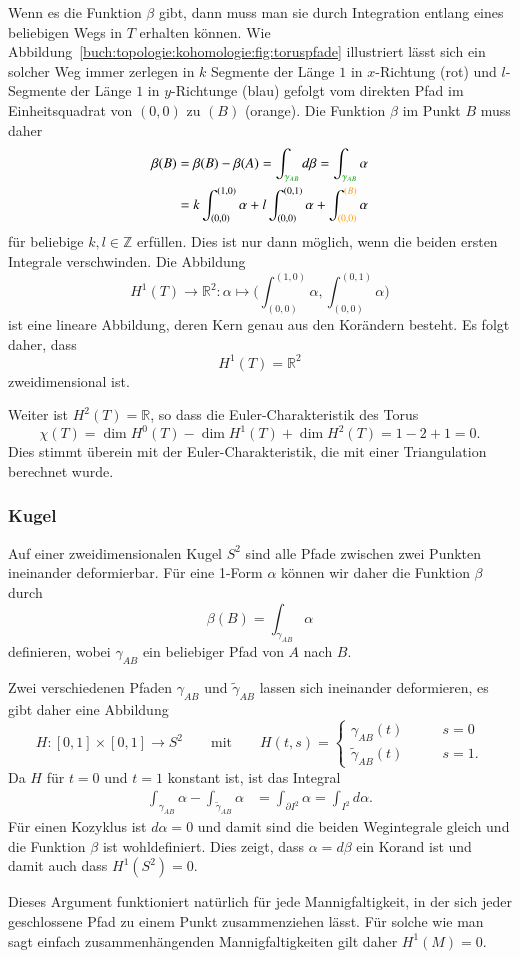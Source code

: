 Wenn es die Funktion $\beta$ gibt, dann muss man sie durch Integration
entlang eines beliebigen Wegs in $T$ erhalten können.
Wie Abbildung~\ref{buch:topologie:kohomologie:fig:toruspfade}
illustriert lässt sich ein solcher Weg immer zerlegen in 
$k$ Segmente der Länge $1$ in $x$-Richtung ({\color{darkred}rot})
und $l$-Segmente der Länge $1$ in $y$-Richtunge ({\color{blue}blau})
gefolgt vom direkten Pfad im Einheitsquadrat von $(0,0)$ zu $(B)$
({\color{orange}orange}).
Die Funktion $\beta$ im Punkt $B$ muss daher
\begin{align*}
\beta(B)
&=
\beta(B) - \beta(A)
=
\int_{{\color{darkgreen}\gamma_{AB}}} d\beta
=
\int_{{\color{darkgreen}\gamma_{AB}}} \alpha
\\
&=
k\int_{(0,0)}^{(1,0)}\alpha
+
l\int_{(0,0)}^{(0,1)}\alpha
+
\int_{(0,0)}^{\color{orange}(B)}\alpha
\end{align*}
für beliebige $k,l\in\mathbb{Z}$ erfüllen.
Dies ist nur dann möglich, wenn die beiden ersten Integrale verschwinden.
Die Abbildung
\[
H^1(T)
\to
\mathbb{R}^2
:
\alpha
\mapsto
\biggl(
\int_{(0,0)}^{(1,0)}
\alpha,
\int_{(0,0)}^{(0,1)}
\alpha
\biggr)
\]
ist eine lineare Abbildung, deren Kern genau aus den Korändern besteht.
Es folgt daher, dass
\[
H^1(T) = \mathbb{R}^2
\]
zweidimensional ist.

Weiter ist $H^2(T)=\mathbb{R}$, so dass die Euler-Charakteristik des Torus
\[
\chi(T)
=
\dim H^0(T) - \dim H^1(T) + \dim H^2(T)
=
1-2+1
=
0.
\]
Dies stimmt überein mit der Euler-Charakteristik, die mit einer Triangulation
berechnet wurde.

%
%
\subsubsection{Kugel}
Auf einer zweidimensionalen Kugel $S^2$ sind alle Pfade zwischen zwei
Punkten ineinander deformierbar.
Für eine 1-Form $\alpha$ können wir daher die Funktion $\beta$ durch
\[
\beta(B)
=
\int_{\gamma_{AB}} \alpha
\]
definieren, wobei $\gamma_{AB}$ ein beliebiger Pfad von $A$ nach $B$.

Zwei verschiedenen Pfaden $\gamma_{AB}$ und $\tilde{\gamma}_{AB}$
lassen sich ineinander deformieren, es gibt daher eine Abbildung
\[
H
\colon
[0,1]\times[0,1] \to S^2
\qquad\text{mit}\qquad
H(t,s)
=
\begin{cases}
\gamma_{AB}(t)          &\qquad s=0\\
\tilde{\gamma}_{AB} (t) &\qquad s=1.
\end{cases}
\]
Da $H$ für $t=0$ und $t=1$ konstant ist, ist das Integral 
\begin{align*}
\int_{\gamma_{AB}} \alpha
-
\int_{\tilde{\gamma}_{AB}} \alpha
&=
\int_{\partial I^2} \alpha
=
\int_{I^2} d\alpha.
\end{align*}
Für einen Kozyklus ist $d\alpha=0$ und damit sind die beiden Wegintegrale
gleich und die Funktion $\beta$ ist wohldefiniert.
Dies zeigt, dass $\alpha=d\beta$ ein Korand ist und damit auch dass
$H^1(S^2)=0$.

Dieses Argument funktioniert natürlich für jede Mannigfaltigkeit,
in der sich jeder geschlossene Pfad zu einem Punkt zusammenziehen
lässt.
Für solche wie man sagt einfach zusammenhängenden Mannigfaltigkeiten
gilt daher $H^1(M)=0$.



